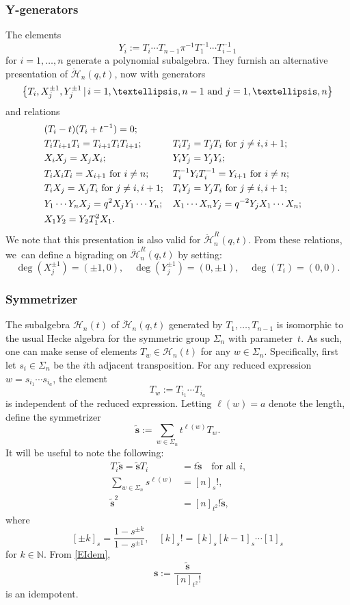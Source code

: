 \documentclass[11pt]{article}
\theoremstyle{definition}
\newcommand{\NN}{\mathbb{N}}
\newcommand{\HH}{\ddot{\mathcal{H}}}
\newcommand{\Hecke}{\mathcal{H}}
\newcommand{\ee}{\boldsymbol{s}}
\begin{document}
\subsubsection{Y-generators}\label{YGen}
The elements
\begin{equation}
Y_i:= T_i\cdots T_{n-1}\pi^{-1} T_1^{-1}\cdots T_{i-1}^{-1}
\label{YDef}
\end{equation}
for $i=1,\ldots,n$ generate a polynomial subalgebra.
They furnish an alternative presentation of $\HH_n(q,t)$, now with generators
\[
\left\{ T_i, X_j^{\pm 1}, Y_j^{\pm 1} \, | \, i=1,\ldots, n-1\hbox{ and }j=1,\ldots, n\right\}
\]
and relations
\begin{equation}
\begin{aligned}
&(T_i-t)(T_i+t^{-1})=0;\\
&T_iT_{i+1}T_i=T_{i+1}T_iT_{i+1};&& T_iT_j=T_jT_i\hbox{ for }j\not=i, i+1;\\
&X_iX_j=X_jX_i; && Y_iY_j=Y_jY_i;\\
&T_i X_i T_i=X_{i+1}\hbox{ for }i\not=n; && T_i^{-1}Y_iT_i^{-1}=Y_{i+1}\hbox{ for }i\not=n;\\
&T_iX_j=X_jT_i\hbox{ for }j\not=i, i+1;&&T_iY_j=Y_jT_i\hbox{ for }j\not=i, i+1;\\
&Y_1\cdots Y_nX_j=q^2X_jY_1\cdots Y_n;&& X_1\cdots X_nY_j=q^{-2}Y_jX_1\cdots X_n;\\
&X_1Y_2=Y_2T^2_1X_1.
\end{aligned}
\label{DAHAY}
\end{equation}
We note that this presentation is also valid for $\HH_n^R(q,t)$.
From these relations, we~can define a bigrading on $\HH_n^R(q,t)$ by setting:
\[
\deg(X_j^{\pm 1})= (\pm 1,0),\quad
\deg(Y_j^{\pm 1})= (0,\pm 1),\quad
\deg(T_i)= (0,0).
\]

\subsubsection{Symmetrizer}\label{Symmetrizer}
The subalgebra $\Hecke_n(t)$ of $\HH_n(q,t)$ generated by $T_1,\ldots, T_{n-1}$ is isomorphic to the usual Hecke algebra for the symmetric group $\Sigma_n$ with parameter~$t$.
As such, one can make sense of elements $T_w\in\Hecke_n(t)$ for any $w\in \Sigma_n$.
Specifically, first let $s_{i}\in\Sigma_n$ be the $i$th adjacent transposition.
For any reduced expression $w=s_{i_1}\cdots s_{i_a}$, the element
\[
T_w:=T_{i_1}\cdots T_{i_a}
\]
is independent of the reduced expression.
Letting $\ell(w)=a$ denote the length, define the symmetrizer
\[
\tilde{\ee}:=\sum_{w\in\Sigma_n}t^{\ell(w)}T_w.
\]
It will be useful to note the following:
\begin{align}
T_i\tilde{\ee}=\tilde{\ee} T_i&= t\tilde{\ee}\quad\text{for all $i$,}\label{EAbsorb}\\
\sum_{w\in \Sigma_n}s^{\ell(w)}&=[n]_s!,\nonumber\\[
-3pt]
\tilde{\ee}^2&=[n]_{t^2}!\tilde{\ee},\label{EIdem}
\end{align}
where
\[
[\pm k]_s=\frac{1-s^{\pm k}}{1-s^{\pm 1}},\quad [k]_s!=[k]_s[k-1]_s\cdots [1]_s
\]
for $k\in\NN$.
From \eqref{EIdem},
\[
\ee:=\frac{\tilde{\ee}}{[n]_{t^2}!}
\]
is an idempotent.
\end{document}
